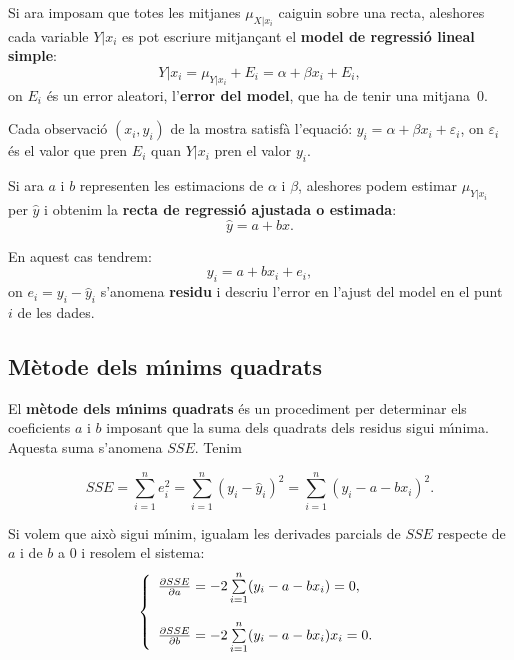 Si ara imposam que totes les mitjanes $\mu_{X|x_i}$ caiguin sobre una recta,
aleshores cada variable $Y|x_i$ es pot escriure mitjan\c cant el {\bf model de
regressi\'o lineal simple}:
$$Y|x_i = \mu_{Y|x_i} + E_i = \alpha + \beta x_i +
E_i,$$ on $E_i$ \'es un error aleatori, 
l'{\bf error del model}, 
que ha de tenir una mitjana~$0$.

Cada observaci\'o 
$(x_i,y_i)$ de la mostra satisf\`a l'equaci\'o: $y_i = \alpha + \beta
x_i + \varepsilon_i$, on $\varepsilon_i$ \'es el valor que pren $E_i$ 
quan $Y|x_i$ pren el valor $y_i$.


Si ara $a$ i $b$ representen les estimacions de $\alpha$ i $\beta$, 
aleshores
podem estimar $\mu_{Y|x_i}$ per $\hat{y}$ i obtenim la 
{\bf recta de regressi\'o ajustada o estimada}: $$\hat{y} = a + b x.$$

En aquest cas tendrem: $$y_i = a + b x_i + e_i,$$ on $e_i = y_i - \hat{y}_i$
s'anomena {\bf residu} i descriu l'error en l'ajust
 del model en el punt~$i$ de les dades.

\subsection{M\`etode dels m\'{\i}nims quadrats}

El {\bf m\`etode dels m\'{\i}nims quadrats} \'es un procediment per determinar els
coeficients $a$ i $b$ imposant que la suma dels quadrats dels residus
 sigui m\'{\i}nima. Aquesta suma s'anomena $SSE$. Tenim

$$SSE = \sum_{i=1}^n e_i^2 = \sum_{i=1}^n (y_i - \hat{y}_i)^2 = \sum_{i=1}^n (y_i
- a - b x_i)^2.$$

Si volem que aix\`o sigui m\'{\i}nim, igualam les derivades parcials 
de $SSE$ respecte
de $a$ i de $b$ a 0 i resolem el sistema:
$$\left\{ \begin{array}{l} {\partial SSE \over \partial a} = -2 
\sum\limits_{i=1}^n (y_i
- a - b x_i) = 0,\\ \\ {\partial SSE \over \partial b} = -2 
\sum\limits_{i=1}^n (y_i - a
- b x_i) x_i = 0. \end{array} \right.$$

